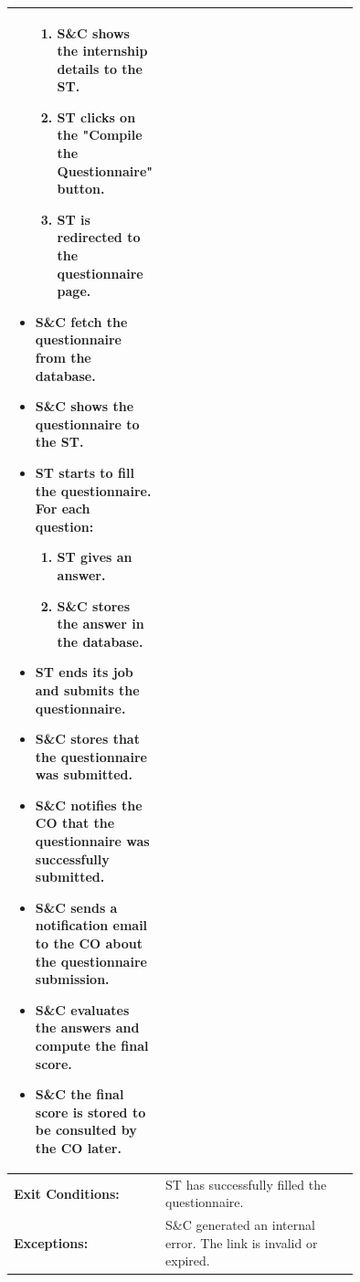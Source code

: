 \begin{center}
\begin{longtable}{|l|p{0.75\linewidth}|}
\begin{itemize}
\begin{enumerate}
                      \item S\&C shows the internship details to the ST.
                      \item ST clicks on the "Compile the Questionnaire" button.
                      \item ST is redirected to the questionnaire page.
                  \end{enumerate}
                                         \item S\&C fetch the questionnaire from the database.
                                         \item S\&C shows the questionnaire to the ST.
                                         \item ST starts to fill the questionnaire. For each question:
                                               \begin{enumerate}
                      \item ST gives an answer.
                      \item S\&C stores the answer in the database.
                  \end{enumerate}
                                         \item ST ends its job and submits the questionnaire.
                                         \item S\&C stores that the questionnaire was submitted.
                                         \item S\&C notifies the CO that the questionnaire was successfully submitted.
                                         \item S\&C sends a notification email to the CO about the questionnaire submission.
                                         \item S\&C evaluates the answers and compute the final score.
                                         \item S\&C the final score is stored to be consulted by the CO later.
                                     \end{itemize} \\
        \hline
        \textbf{Exit Conditions:}  & ST has successfully filled the questionnaire.                                      \\
        \hline
        \textbf{Exceptions:}       & S\&C generated an internal error. The link is invalid or expired.                  \\
        \hline
    \end{longtable}
\end{center}

